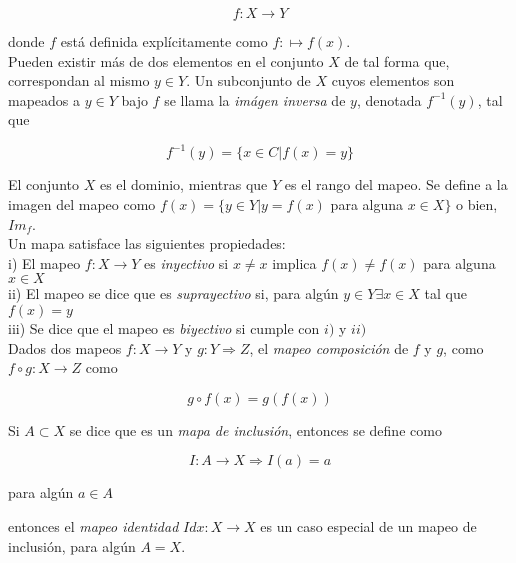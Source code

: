 \documentclass{report}
\begin{document}
\begin{equation}
f : X \rightarrow Y
\end{equation}

donde $f$ está definida explícitamente como $f : \mapsto f(x)$.\\

Pueden existir más de dos elementos en el conjunto $X$ de tal forma que, correspondan al mismo $y \in Y$. Un subconjunto de $X$ cuyos elementos son mapeados a $y \in Y$ bajo $f$ se llama la \textit{imágen inversa} de $y$, denotada $f^{-1}(y)$, tal  que

\begin{equation}
f^{-1}(y) = \lbrace x \in C| f(x) = y \rbrace
\end{equation}

El conjunto $X$ es el dominio, mientras que $Y$ es el rango del mapeo. Se define a la imagen del mapeo como $f(x) = \lbrace y \in Y | y = f(x)$ para alguna $x \in X \rbrace$ o bien, $Im_{f}$.\\

Un mapa satisface las siguientes propiedades:\\

i) El mapeo $f: X \rightarrow Y$ es \textit{inyectivo} si $x \neq x$ implica $f(x) \neq f (x)$ para alguna $x \in X$\\

ii) El mapeo se dice que es \textit{suprayectivo} si, para algún $y \in Y \exists x \in X$ tal que $f(x) = y$ \\

iii) Se dice que el mapeo es\textit{ biyectivo} si cumple con $i)$ y $ii)$\\

Dados dos mapeos $f : X \rightarrow Y$ y $g : Y \Longrightarrow Z$, el \textit{mapeo composición} de $f$ y $g$, como $f \circ g : X \rightarrow Z $ como

\begin{equation}
g \circ f (x) = g (f(x))
\end{equation}

Si $A \subset X$ se dice que es un \textit{mapa de inclusión}, entonces se define como

\begin{equation}
I : A \rightarrow X \Rightarrow I(a)=a
\end{equation}

para algún $a \in A$

entonces el \textit{mapeo identidad} $I dx : X \rightarrow X$ es un caso especial de un mapeo de inclusión, para algún $A = X$.\\
\end{document}
